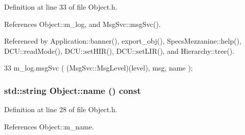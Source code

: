 Definition at line 33 of file Object.h.

References Object::m\_\-log, and MsgSvc::msgSvc().

Referenced by Application::banner(), export\_\-obj(), SpecsMezzanine::help(), DCU::readMode(), DCU::setHIR(), DCU::setLIR(), and Hierarchy::tree().


\begin{DoxyCode}
33 { m_log.msgSvc ( (MsgSvc::MsgLevel)(level), msg, name ); }
\end{DoxyCode}
\hypertarget{classObject_a975e888d50bfcbffda2c86368332a5cd}{
\subsubsection[{name}]{\setlength{\rightskip}{0pt plus 5cm}std::string Object::name () const}}
\label{classObject_a975e888d50bfcbffda2c86368332a5cd}


Definition at line 28 of file Object.h.

References Object::m\_\-name.

